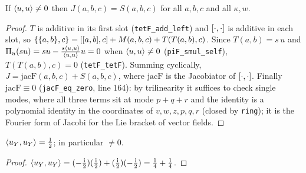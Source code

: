 \documentclass[11pt]{article}\emergencystretch=2em
\theoremstyle{definition}\newtheorem{definition}[theorem]{Definition}\theoremstyle{remark}\newtheorem{remark}[theorem]{Remark}
\newcommand{\ii}{\mathrm{i}}
\begin{document}
\begin{lemma}\label{lem:red}
If $\langle u,u\rangle\ne0$ then $J(a,b,c)=S(a,b,c)$ for all $a,b,c$ and all $\kappa,w$.
\end{lemma}
\begin{proof}
$T$ is additive in its first slot (\texttt{tetF\_add\_left}) and $[\cdot,\cdot]$ is additive in each slot, so
$\{\{a,b\},c\}=[[a,b],c]+M(a,b,c)+T(T(a,b),c)$. Since $T(a,b)=s\,u$ and $\Pi_u(su)=su-\frac{s\langle u,u\rangle}{\langle u,u\rangle}u=0$ when $\langle u,u\rangle\ne0$ (\texttt{piF\_smul\_self}), $T(T(a,b),c)=0$ (\texttt{tetF\_tetF}). Summing cyclically, $J=\mathrm{jacF}(a,b,c)+S(a,b,c)$, where $\mathrm{jacF}$ is the Jacobiator of $[\cdot,\cdot]$. Finally $\mathrm{jacF}\equiv0$ (\texttt{jacF\_eq\_zero}, line 164): by trilinearity it suffices to check single modes, where all three terms sit at mode $p+q+r$ and the identity is a polynomial identity in the coordinates of $v,w,z,p,q,r$ (closed by \texttt{ring}); it is the Fourier form of Jacobi for the Lie bracket of vector fields.
\end{proof}
\begin{lemma}\label{lem:uu} $\langle u_Y,u_Y\rangle=\tfrac12$; in particular $\ne0$. \end{lemma}
\begin{proof} $\pr{u_Y}{u_Y}=(-\tfrac{\ii}{2})(\tfrac{\ii}{2})+(\tfrac{\ii}{2})(-\tfrac{\ii}{2})=\tfrac14+\tfrac14$. \end{proof}
\end{document}
